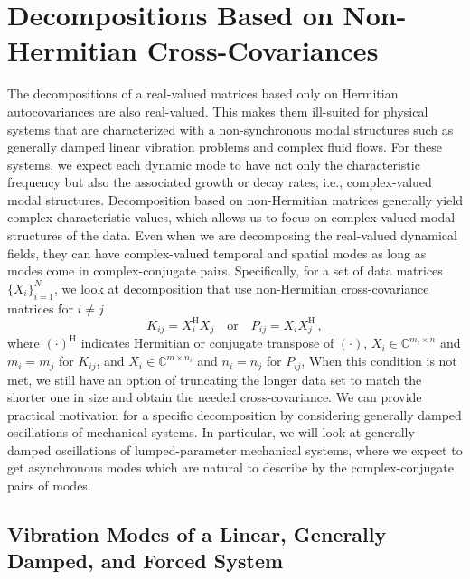 \documentclass[10pt]{article}
\begin{document}
\section{Decompositions Based on Non-Hermitian Cross-Covariances}

The decompositions of a real-valued matrices based only on Hermitian autocovariances are also real-valued.
This makes them ill-suited for physical systems that are characterized with a non-synchronous modal structures such as generally damped linear vibration problems and complex fluid flows.
For these systems, we expect each dynamic mode to have not only the characteristic frequency but also the associated growth or decay rates, i.e., complex-valued modal structures.
Decomposition based on non-Hermitian matrices generally yield complex characteristic values, which allows us to focus on complex-valued modal structures of the data.
Even when we are decomposing the real-valued dynamical fields, they can have complex-valued temporal and spatial modes as long as modes come in complex-conjugate pairs.
Specifically, for a set of data matrices $\{X_i\}_{i=1}^N$, we look at decomposition that use non-Hermitian cross-covariance matrices for $i\ne j$
\begin{equation}
    K_{ij} = X_i^\mathrm{H} X_j \quad \mathrm{or} \quad P_{ij} = X_i X_j^\mathrm{H}\,,
\end{equation}
where $(\cdot)^\mathrm{H}$ indicates Hermitian or conjugate transpose of $(\cdot)$, $X_i\in\mathbb{C}^{m_{i} \times n }$ and $m_i = m_j$ for $K_{ij}$, and $X_i\in \mathbb{C}^{m\times n_{i}}$ and $n_i = n_j$  for $P_{ij}$,
When this condition is not met, we still have an option of truncating the longer data set to match the shorter one in size and obtain the needed cross-covariance.
We can provide practical motivation for a specific decomposition by considering generally damped oscillations of mechanical systems.
In particular, we will look at generally damped oscillations of lumped-parameter mechanical systems, where we expect to get asynchronous modes which are natural to describe by the complex-conjugate pairs of modes.

\subsection{Vibration Modes of a Linear, Generally Damped, and Forced System}
\end{document}
